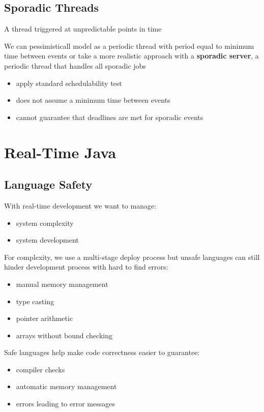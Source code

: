 \documentclass[]{article}
\theoremstyle{definition}
\begin{document}
	\subsection{Sporadic Threads}
	A thread triggered at unpredictable points in time

	We can pessimisticall model as a periodic thread with period equal to minimum time between events or take a more realistic approach with a \textbf{sporadic server}, a periodic thread that handles all sporadic jobs
	\begin{itemize}
		\item apply standard schedulability test
		\item does not assume a minimum time between events
		\item cannot guarantee that deadlines are met for sporadic events
	\end{itemize}


	\section{Real-Time Java}

	\subsection{Language Safety}
	With real-time development we want to manage:
	\begin{itemize}
		\item system complexity
		\item system development
	\end{itemize}

	For complexity, we use a multi-stage deploy process but unsafe languages can still hinder development process with hard to find errors:
	\begin{itemize}
		\item manual memory management
		\item type casting
		\item pointer arithmetic
		\item arrays without bound checking
	\end{itemize}
	Safe languages help make code correctness easier to guarantee:
	\begin{itemize}
		\item compiler checks
		\item automatic memory management
		\item errors leading to error messages
	\end{itemize}
\end{document}
